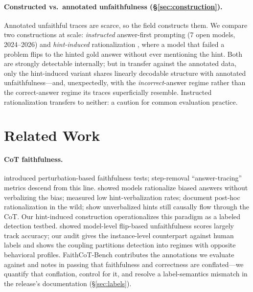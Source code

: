 \documentclass[11pt]{article}
\begin{document}
\paragraph{Constructed vs.\ annotated unfaithfulness (\S\ref{sec:construction}).} Annotated unfaithful traces are scarce, so the field constructs them. We compare two constructions at scale: \emph{instructed} answer-first prompting (7 open models, 2024--2026) and \emph{hint-induced} rationalization \citep{turpin2023language}, where a model that failed a problem flips to the hinted gold answer without ever mentioning the hint. Both are strongly detectable internally; but in transfer against the annotated data, only the hint-induced variant shares linearly decodable structure with annotated unfaithfulness---and, unexpectedly, with the \emph{incorrect}-answer regime rather than the correct-answer regime its traces superficially resemble. Instructed rationalization transfers to neither: a caution for common evaluation practice.

\section{Related Work}
\label{sec:related}

\paragraph{CoT faithfulness.} \citet{lanham2023measuring} introduced perturbation-based faithfulness tests; step-removal ``answer-tracing'' metrics descend from this line. \citet{turpin2023language} showed models rationalize biased answers without verbalizing the bias; \citet{chen2025reasoning} measured low hint-verbalization rates; \citet{arcuschin2025wild} document post-hoc rationalization in the wild; \citet{zaman2026hint} show unverbalized hints still causally flow through the CoT. Our hint-induced construction operationalizes this paradigm as a labeled detection testbed. \citet{bentham2024disguised} showed model-level flip-based unfaithfulness scores largely track accuracy; our audit gives the instance-level counterpart against human labels and shows the coupling partitions detection into regimes with opposite behavioral profiles. FaithCoT-Bench \citep{shen2026faithcot} contributes the annotations we evaluate against and notes in passing that faithfulness and correctness are conflated---we quantify that conflation, control for it, and resolve a label-semantics mismatch in the release's documentation (\S\ref{sec:labels}).
\end{document}
